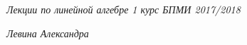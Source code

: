 \documentclass[a4paper]{article}
\begin{document}
    \begin{flushright}
      \textit{Лекции по линейной алгебре 1 курс БПМИ 2017/2018}
      
      \textit{Левина Александра}
    \end{flushright}

    \tableofcontents

    \newpage

    
    
\end{document}
